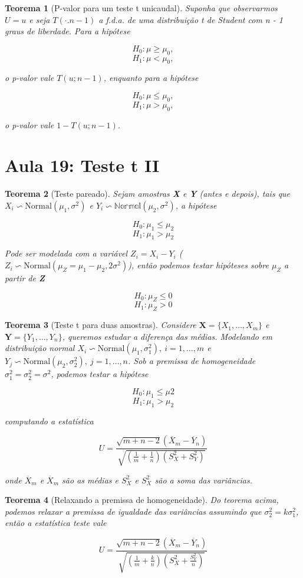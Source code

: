 \documentclass{article}
\newtheorem{theorem}{Teorema}
\begin{document}
\begin{theorem}[P-valor para um teste t unicaudal]
Suponha que observarmos $U = u$ e seja $T(\cdot. n - 1)$ a f.d.a. de uma distribuição t de Student com n - 1 graus de liberdade. Para a hipótese

$$H_0 : \mu \geq \mu_0,$$
$$H_1 : \mu < \mu_0,$$

o p-valor vale $T(u; n-1)$, enquanto para a hipótese

$$H_0 : \mu \leq \mu_0,$$
$$H_1 : \mu > \mu_0,$$

o p-valor vale $1 - T(u; n-1)$.
\end{theorem}

\section*{Aula 19: Teste t II}\label{s19}
\begin{theorem}[Teste pareado]
Sejam amostras \textbf{X} e \textbf{Y} (antes e depois), tais que $X_i \backsim \mathrm{Normal}(\mu_1, \sigma^2)$ e $Y_i \backsim \mathbb{Normal}(\mu_2, \sigma^2)$, a hipótese

$$H_0 : \mu_1 \leq \mu_2$$
$$H_1 : \mu_1 > \mu_2$$

Pode ser modelada com a variável $Z_i = X_i - Y_i$ ($Z_i \backsim \mathrm{Normal}(\mu_Z = \mu_1 - \mu_2, 2 \sigma^2)$), então podemos testar hipóteses sobre $\mu_Z$ a partir de \textbf{Z}

$$H_0 : \mu_Z \leq 0$$
$$H_1 : \mu_Z > 0$$
\end{theorem}

\begin{theorem}[Teste t para duas amostras]
Considere $\textbf{X} = \{ X_1, \ldots, X_m \}$ e $\textbf{Y} = \{ Y_1, \ldots, Y_n \}$, queremos estudar a diferença das médias. Modelando em distribuição normal $X_i \backsim \mathrm{Normal}(\mu_1, \sigma_1^2), \ i = 1, \ldots, m$ e $Y_j \backsim \mathrm{Normal}(\mu_2, \sigma_2^2), \ j = 1, \ldots, n$. Sob a premissa de homogeneidade $\sigma_1^2 = \sigma_2^2 = \sigma^2$, podemos testar a hipótese

$$H_0 : \mu_1 \leq \mu2$$
$$H_1 : \mu_1 > \mu_2$$

computando a estatística

$$U = \frac{\sqrt{m + n - 2} (\overline{X}_m - \overline{Y}_n)}{\sqrt{(\frac{1}{m} + \frac{1}{n})(S_X^2 + S_Y^2)}}$$

onde $\overline{X}_m$ e $\overline{X}_m$ são as médias e $S_X^2$ e $S_X^2$ são a soma das variâncias.
\end{theorem}

\begin{theorem}[Relaxando a premissa de homogeneidade]
Do teorema acima, podemos relaxar a premissa de igualdade das variâncias assumindo que $\sigma_2^2 = k \sigma_1^2$, então a estatística teste vale

$$U = \frac{\sqrt{m + n - 2} (\overline{X}_m - \overline{Y}_n)}{\sqrt{(\frac{1}{m} + \frac{k}{n})(S_X^2 + \frac{S_Y^2}{n})}}$$
\end{theorem}
\end{document}
